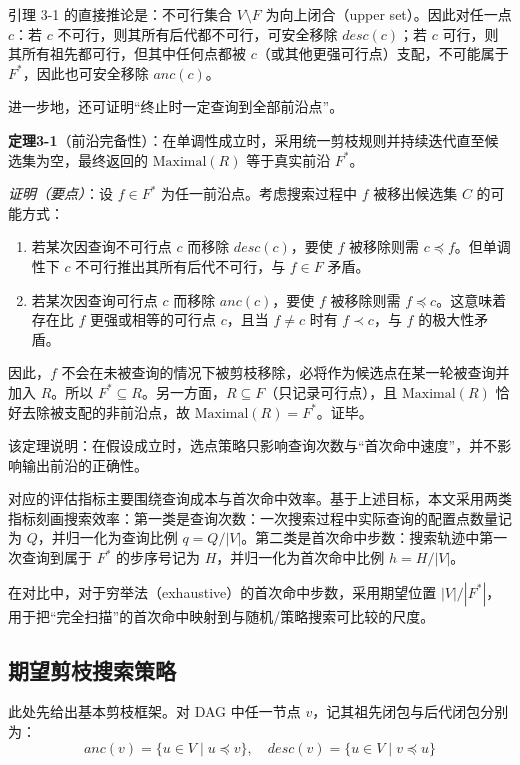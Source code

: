 \documentclass[UTF8,a4paper,12pt]{ctexart}
\numberwithin{equation}{section}
\begin{document}
引理 3-1 的直接推论是：不可行集合 \(V\setminus F\) 为向上闭合（upper
set）。因此对任一点 \(c\)：若 \(c\) 不可行，则其所有后代都不可行，可安全移除 \(desc(c)\)；若 \(c\)
可行，则其所有祖先都可行，但其中任何点都被
\(c\)（或其他更强可行点）支配，不可能属于 \(F^*\)，因此也可安全移除
\(anc(c)\)。

进一步地，还可证明``终止时一定查询到全部前沿点''。

\textbf{定理3-1}（前沿完备性）：在单调性成立时，采用统一剪枝规则并持续迭代直至候选集为空，最终返回的
\(\text{Maximal}(R)\) 等于真实前沿 \(F^*\)。

\emph{证明（要点）}：设 \(f\in F^*\) 为任一前沿点。考虑搜索过程中 \(f\)
被移出候选集 \(C\) 的可能方式：
\begin{enumerate}
\def\labelenumi{\arabic{enumi}.}
\item
  若某次因查询不可行点 \(c\) 而移除 \(desc(c)\)，要使 \(f\) 被移除则需
  \(c\preceq f\)。但单调性下 \(c\) 不可行推出其所有后代不可行，与
  \(f\in F\) 矛盾。
\item
  若某次因查询可行点 \(c\) 而移除 \(anc(c)\)，要使 \(f\) 被移除则需
  \(f\preceq c\)。这意味着存在比 \(f\) 更强或相等的可行点 \(c\)，且当
  \(f\ne c\) 时有 \(f\prec c\)，与 \(f\) 的极大性矛盾。
\end{enumerate}

因此，\(f\)
不会在未被查询的情况下被剪枝移除，必将作为候选点在某一轮被查询并加入
\(R\)。所以
\(F^*\subseteq R\)。另一方面，\(R\subseteq F\)（只记录可行点），且
\(\text{Maximal}(R)\) 恰好去除被支配的非前沿点，故
\(\text{Maximal}(R)=F^*\)。证毕。

该定理说明：在假设成立时，选点策略只影响查询次数与``首次命中速度''，并不影响输出前沿的正确性。

对应的评估指标主要围绕查询成本与首次命中效率。基于上述目标，本文采用两类指标刻画搜索效率：第一类是查询次数：一次搜索过程中实际查询的配置点数量记为
\(Q\)，并归一化为查询比例
\(q=Q/|V|\)。第二类是首次命中步数：搜索轨迹中第一次查询到属于 \(F^*\)
的步序号记为 \(H\)，并归一化为首次命中比例 \(h=H/|V|\)。

在对比中，对于穷举法（exhaustive）的首次命中步数，采用期望位置
\(|V|/|F^*|\)，用于把``完全扫描''的首次命中映射到与随机/策略搜索可比较的尺度。

\subsection{期望剪枝搜索策略}

此处先给出基本剪枝框架。对 DAG 中任一节点 \(v\)，记其祖先闭包与后代闭包分别为：
\begin{equation}
anc(v) = \{u \in V \mid u \preceq v\}, \quad desc(v) = \{u \in V \mid v \preceq u\}
\end{equation}
\end{document}
